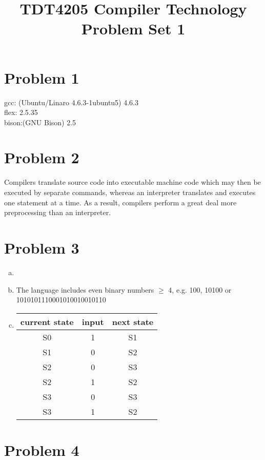 \documentclass[titlepage]{article}
\begin{document}
\title{TDT4205 Compiler Technology Problem Set 1}
\maketitle
\setcounter{secnumdepth}{0}

\section{Problem 1}
gcc: (Ubuntu/Linaro 4.6.3-1ubuntu5) 4.6.3\\
flex: 2.5.35\\
bison:(GNU Bison) 2.5\\

\section{Problem 2}
Compilers translate source code into executable machine code which may then be executed by separate commands, whereas an interpreter translates and executes one statement at a time. As a result, compilers perform a great deal more preprocessing than an interpreter.

\section{Problem 3}
\begin{enumerate}[a)]
\item \leavevmode{\vspace{-\baselineskip}}\\
\item
The language includes even binary numbers $\ge$ 4, e.g. 100, 10100 or 1010101110001010010010110
\item
\begin{tabular}{c c|c}
current state & input & next state\\
\hline
S0 & 1 & S1\\
S1 & 0 & S2\\
S2 & 0 & S3\\
S2 & 1 & S2\\
S3 & 0 & S3\\
S3 & 1 & S2\\
\end{tabular}
\end{enumerate}

\section{Problem 4}
\end{document}
